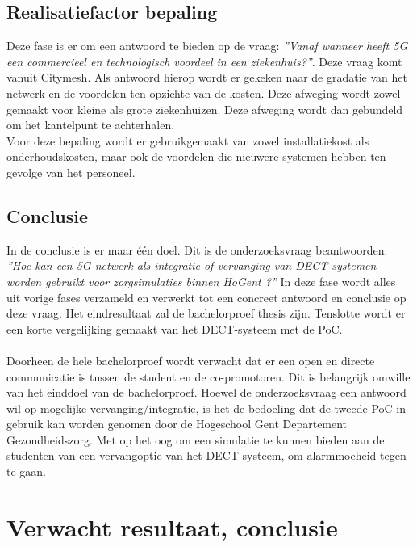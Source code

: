 \subsection{Realisatiefactor bepaling}
Deze fase is er om een antwoord te bieden op de vraag: \textit{''Vanaf wanneer heeft 5G een commercieel en technologisch voordeel in een ziekenhuis?''}. Deze vraag komt vanuit Citymesh. Als antwoord hierop wordt er gekeken naar de gradatie van het netwerk en de voordelen ten opzichte van de kosten. Deze afweging wordt zowel gemaakt voor kleine als grote ziekenhuizen. Deze afweging wordt dan gebundeld om het kantelpunt te achterhalen. \\ Voor deze bepaling wordt er gebruikgemaakt van zowel installatiekost als onderhoudskosten, maar ook de voordelen die nieuwere systemen hebben ten gevolge van het personeel. 

\subsection{Conclusie}
In de conclusie is er maar één doel. Dit is de onderzoeksvraag beantwoorden: \textit{''Hoe kan een 5G-netwerk als integratie of vervanging van DECT-systemen worden gebruikt voor zorgsimulaties binnen HoGent ?''} In deze fase wordt alles uit vorige fases verzameld en verwerkt tot een concreet antwoord en conclusie op deze vraag. Het eindresultaat zal de bachelorproef thesis zijn. Tenslotte wordt er een korte vergelijking gemaakt van het DECT-systeem met de PoC.
\\\\
Doorheen de hele bachelorproef wordt verwacht dat er een open en directe communicatie is tussen de student en de co-promotoren. Dit is belangrijk omwille van het einddoel van de bachelorproef. Hoewel de onderzoeksvraag een antwoord wil op mogelijke vervanging/integratie, is het de bedoeling dat de tweede PoC in gebruik kan worden genomen door de Hogeschool Gent Departement Gezondheidszorg. Met op het oog om een simulatie te kunnen bieden aan de studenten van een vervangoptie van het DECT-systeem, om alarmmoeheid tegen te gaan.

\section{Verwacht resultaat, conclusie}%
\label{sec:verwachte_resultaten}

